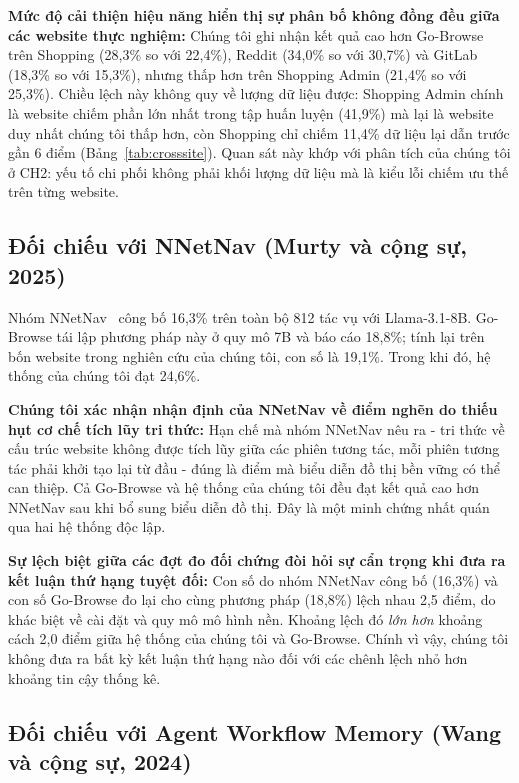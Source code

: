 \textbf{Mức độ cải thiện hiệu năng hiển thị sự phân bố không đồng đều giữa các website thực nghiệm:} Chúng tôi ghi nhận kết quả cao hơn Go-Browse trên Shopping (28{,}3\% so với 22{,}4\%), Reddit (34{,}0\% so với 30{,}7\%) và GitLab (18{,}3\% so với 15{,}3\%), nhưng thấp hơn trên Shopping Admin (21{,}4\% so với 25{,}3\%). Chiều lệch này không quy về lượng dữ liệu được: Shopping Admin chính là website chiếm phần lớn nhất trong tập huấn luyện (41{,}9\%) mà lại là website duy nhất chúng tôi thấp hơn, còn Shopping chỉ chiếm 11{,}4\% dữ liệu lại dẫn trước gần 6 điểm (Bảng~\ref{tab:crosssite}). Quan sát này khớp với phân tích của chúng tôi ở CH2: yếu tố chi phối không phải khối lượng dữ liệu mà là kiểu lỗi chiếm ưu thế trên từng website.

\subsection{Đối chiếu với NNetNav (Murty và cộng sự, 2025)}

Nhóm NNetNav~\cite{murty2024nnetnav} công bố 16{,}3\% trên toàn bộ 812 tác vụ với Llama-3.1-8B. Go-Browse tái lập phương pháp này ở quy mô 7B và báo cáo 18{,}8\%; tính lại trên bốn website trong nghiên cứu của chúng tôi, con số là 19{,}1\%. Trong khi đó, hệ thống của chúng tôi đạt 24{,}6\%.

\textbf{Chúng tôi xác nhận nhận định của NNetNav về điểm nghẽn do thiếu hụt cơ chế tích lũy tri thức:} Hạn chế mà nhóm NNetNav nêu ra - tri thức về cấu trúc website không được tích lũy giữa các phiên tương tác, mỗi phiên tương tác phải khởi tạo lại từ đầu - đúng là điểm mà biểu diễn đồ thị bền vững có thể can thiệp. Cả Go-Browse và hệ thống của chúng tôi đều đạt kết quả cao hơn NNetNav sau khi bổ sung biểu diễn đồ thị. Đây là một minh chứng nhất quán qua hai hệ thống độc lập.

\textbf{Sự lệch biệt giữa các đợt đo đối chứng đòi hỏi sự cẩn trọng khi đưa ra kết luận thứ hạng tuyệt đối:} Con số do nhóm NNetNav công bố (16{,}3\%) và con số Go-Browse đo lại cho cùng phương pháp (18{,}8\%) lệch nhau 2{,}5 điểm, do khác biệt về cài đặt và quy mô mô hình nền. Khoảng lệch đó \emph{lớn hơn} khoảng cách 2{,}0 điểm giữa hệ thống của chúng tôi và Go-Browse. Chính vì vậy, chúng tôi không đưa ra bất kỳ kết luận thứ hạng nào đối với các chênh lệch nhỏ hơn khoảng tin cậy thống kê.

\subsection{Đối chiếu với Agent Workflow Memory (Wang và cộng sự, 2024)}

